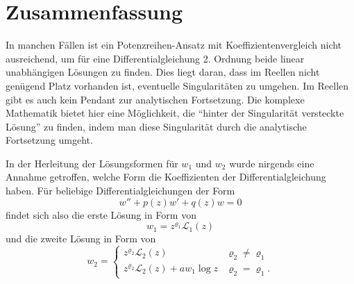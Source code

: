 \section{Zusammenfassung}
In manchen Fällen ist ein Potenzreihen-Ansatz mit Koeffizientenvergleich nicht ausreichend, um für eine Differentialgleichung 2. Ordnung beide linear unabhängigen Lösungen zu finden. 
Dies liegt daran, dass im Reellen nicht genügend Platz vorhanden ist, eventuelle Singularitäten zu umgehen. 
Im Reellen gibt es auch kein Pendant zur analytischen Fortsetzung. 
Die komplexe Mathematik bietet hier eine Möglichkeit, die ``hinter der Singularität versteckte Lösung'' zu finden, indem man diese Singularität durch die analytische Fortsetzung umgeht. 

In der Herleitung der Lösungsformen für $w_1$ und $w_2$ wurde nirgends eine Annahme getroffen, welche Form die Koeffizienten der Differentialgleichung haben. 
Für beliebige Differentialgleichungen der Form
\[w'' + p(z)w' + q(z)w=0\]
findet sich also die erste Lösung in Form von
\[ w_1 = z^{\varrho_1}\mathcal{L}_1(z)\]
und die zweite Lösung in Form von
\[w_2 = \begin{cases}
z^{\varrho_2}\mathcal{L}_2(z) & \varrho_2\ne\varrho_1 \\
z^{\varrho_2}\mathcal{L}_2(z) + a w_1 \log z & \varrho_2=\varrho_1.
\end{cases} \]

